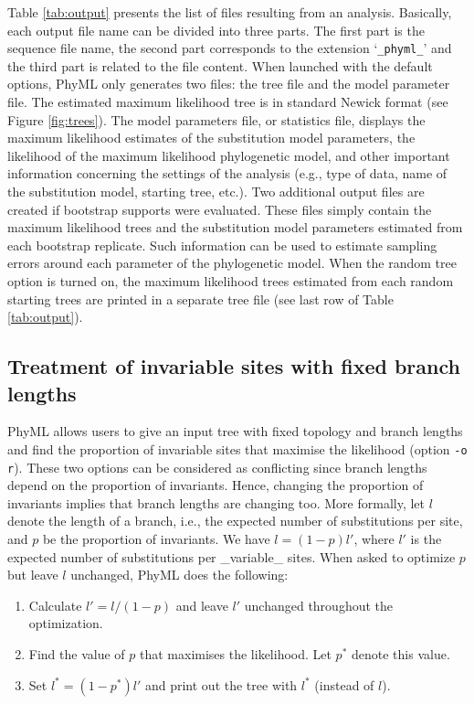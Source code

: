 \documentclass[a4paper,12pt]{article}
\newcommand{\x}[1]{\texttt{#1}}
\begin{document}
Table  \ref{tab:output} presents  the list  of files  resulting from  an analysis.   Basically, each
output file  name can be divided into  three parts.  The first  part is the sequence  file name, the
second part corresponds to  the extension `\x{\_phyml\_}' and the third part  is related to the file
content.  When launched with the default options,  PhyML only generates two files: the tree file and
the model parameter file.   The estimated maximum likelihood tree is in  standard Newick format (see
Figure  \ref{fig:trees}).  The  model  parameters file,  or  statistics file,  displays the  maximum
likelihood estimates of the substitution model  parameters, the likelihood of the maximum likelihood
phylogenetic model, and  other important information concerning the settings  of the analysis (e.g.,
type of data, name of the substitution model, starting tree, etc.).  Two additional output files are
created if  bootstrap supports were  evaluated.  These files  simply contain the  maximum likelihood
trees  and  the  substitution  model  parameters  estimated from  each  bootstrap  replicate.   Such
information can be used to estimate sampling errors around each parameter of the phylogenetic model.
When the random  tree option is turned on,  the maximum likelihood trees estimated  from each random
starting trees are printed in a separate tree file (see last row of Table \ref{tab:output}).

\subsection{Treatment of invariable sites with fixed branch lengths}

PhyML  allows users  to give  an input  tree with  fixed topology  and branch  lengths and  find the
proportion of invariable sites that maximise the likelihood (option \x{-o r}). These two options can
be considered  as conflicting since  branch lengths depend  on the proportion of  invariants. Hence,
changing the proportion  of invariants implies that branch lengths are  changing too. More formally,
let $l$ denote the length of a branch,  i.e., the expected number of substitutions per site, and $p$
be  the proportion  of invariants.  We have  $l =  (1-p)l'$, where  $l'$ is  the expected  number of
substitutions per  \_variable\_ sites.  When  asked to optimize  $p$ but leave $l$  unchanged, PhyML
does the following:
\begin{enumerate}
\item Calculate $l' = l/(1-p)$ and leave $l'$ unchanged throughout the optimization.
\item Find the value of $p$ that maximises the likelihood. Let $p^{*}$ denote this value.
\item Set $l^{*} = (1-p^{*})l'$ and print out the tree with $l^{*}$ (instead of $l$).
\end{enumerate} 
\end{document}
